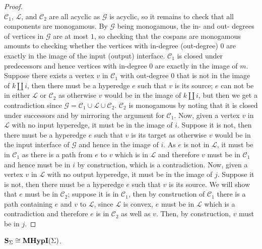 \begin{proof}
\[\]
$\mathcal{C}_{1}$, $\mathcal{L}$, and $\mathcal{C}_{2}$ are all acyclic as $\mathcal{G}$ is acyclic, so it remains to check that all components are monogamous.
By $\mathcal{G}$ being monogamous, the in- and out- degrees of vertices in $\mathcal{G}$ are at most $1$, so checking that the cospans are monogamous amounts to checking whether the vertices with in-degree (out-degree) $0$ are exactly in the image of the input (output) interface.
$\mathcal{C}_{1}$ is closed under predecessors and hence vertices with in-degree $0$ are exactly in the image of $m$.
Suppose there exists a vertex $v$ in $\mathcal{C}_{1}$ with out-degree $0$ that is not in the image of $k \coprod i$, then there must be a hyperedge $e$ such that $v$ is its source; $e$ can not be in either $\mathcal{L}$ or $\mathcal{C}_{2}$ as otherwise $v$ would be in the image of $k \coprod i$, but then we get a contradiction since $\mathcal{G} = \mathcal{C}_{1} \cup \mathcal{L} \cup \mathcal{C}_{2}$.
$\mathcal{C}_{2}$ is monogamous by noting that it is closed under successors and by mirroring the argument for $\mathcal{C}_{1}$.
Now, given a vertex $v$ in $\mathcal{L}$ with no input hyperedge, it must be in the image of $i$.
Suppose it is not, then there must be a hyperedge $e$ such that $v$ is its target as otherwise $v$ would be in the input interface of $\mathcal{G}$ and hence in the image of $i$.
As $e$ is not in $\mathcal{L}$, it must be in $\mathcal{C}_{1}$ as there is a path from $e$ to $v$ which is in $\mathcal{L}$ and therefore $v$ must be in $\mathcal{C}_{1}$ and hence must be in $i$ by construction, which is a contradiction.
Now, given a vertex $v$ in $\mathcal{L}$ with no output hyperedge, it must be in the image of $j$.
Suppose it is not, then there must be a hyperedge $e$ such that $v$ is its source.
We will show that $e$ must be in $\mathcal{C}_{2}$; suppose it is in $\mathcal{C}_{1}$, then by construction of $\mathcal{C}_{1}$ there is a path containing $e$ and $v$ to $\mathcal{L}$, since $\mathcal{L}$ is convex, $e$ must be in $\mathcal{L}$ which is a contradiction and therefore $e$ is in $\mathcal{C}_{2}$ as well as $v$.
Then, by construction, $v$ must be in $j$.
\end{proof}
\begin{theorem}\label{theorem:monogamous_isomorphism}
$\mathbf{S}_{\Sigma} \cong \mathbf{MHypI}(\Sigma)$.
\end{theorem}
